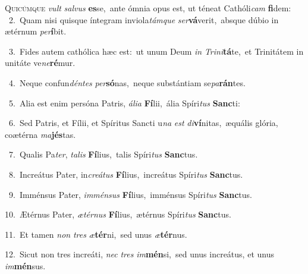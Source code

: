 \lettrine{\initial\textcolor{\initialcolor}{Q}}{uicúmque} \textit{vult} \textit{sal}\-\textit{vus} \textbf{es}\-se,~\star ante ómnia opus est, ut téneat Cathóli\textit{cam} \textbf{fi}\-dem:\\
{\numbfont\textcolor{\numbcolor}{~2.}}~Quam nisi quisque íntegram inviola\-\textit{tám}\-\textit{que} \textit{ser}\-\textbf{vá}verit,~\star absque dúbio in ætérnum \textit{per}\-\textbf{í}bit.\par
{\numbfont\textcolor{\numbcolor}{~3.}}~Fides autem cathólica hæc est:~\dagger ut unum Deum \textit{in} \textit{Tri}\-\textit{ni}\textbf{tá}te,~\star et Trinitátem in unitáte ve\-\textit{ne}\-\textbf{ré}mur.\par
{\numbfont\textcolor{\numbcolor}{~4.}}~Neque confun\-\textit{dén}\-\textit{tes} \textit{per}\-\textbf{só}nas,~\star neque substántiam se\-\textit{pa}\-\textbf{rán}tes.\par
{\numbfont\textcolor{\numbcolor}{~5.}}~Alia est enim persóna Patris, \textit{á}\-\textit{li}\textit{a} \textbf{Fí}\-lii,~\star ália Spíri\textit{tus} \textbf{Sanc}\-ti:\par
{\numbfont\textcolor{\numbcolor}{~6.}}~Sed Patris, et Fílii, et Spíritus Sancti u\textit{na} \textit{est} \textit{di}\-\textbf{ví}nitas,~\star æquális glória, coætérna \textit{ma}\-\textbf{jés}tas.\par
{\numbfont\textcolor{\numbcolor}{~7.}}~Qualis Pa\-\textit{ter}\-, \textit{ta}\-\textit{lis} \textbf{Fí}\-lius,~\star talis Spíri\textit{tus} \textbf{Sanc}\-tus.\par
{\numbfont\textcolor{\numbcolor}{~8.}}~Increátus Pater, in\-\textit{cre}\-\textit{á}\textit{tus} \textbf{Fí}\-lius,~\star increátus Spíri\textit{tus} \textbf{Sanc}\-tus.\par
{\numbfont\textcolor{\numbcolor}{~9.}}~Imménsus Pater, \textit{im}\-\textit{mén}\textit{sus} \textbf{Fí}\-lius,~\star imménsus Spíri\textit{tus} \textbf{Sanc}\-tus.\par
{\numbfont\textcolor{\numbcolor}{10.}}~Ætérnus Pater, \textit{æ}\-\textit{tér}\textit{nus} \textbf{Fí}\-lius,~\star ætérnus Spíri\textit{tus} \textbf{Sanc}\-tus.\par
{\numbfont\textcolor{\numbcolor}{11.}}~Et tamen \textit{non} \textit{tres} \textit{æ}\-\textbf{tér}ni,~\star sed unus \textit{æ}\-\textbf{tér}nus.\par
{\numbfont\textcolor{\numbcolor}{12.}}~Sicut non tres increáti, \textit{nec} \textit{tres} \textit{im}\-\textbf{mén}si,~\star sed unus increátus, et unus \textit{im}\-\textbf{mén}sus.\par

